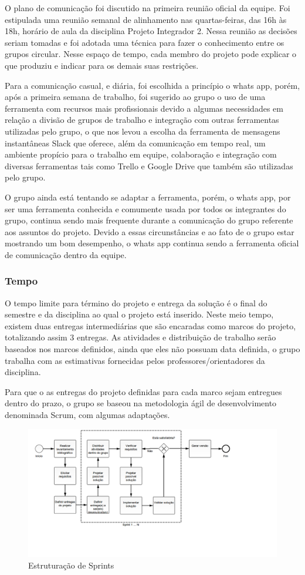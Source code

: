 O plano de comunicação foi discutido na primeira reunião oficial da equipe. Foi estipulada uma reunião semanal de alinhamento nas quartas-feiras, das 16h às 18h, horário de aula da disciplina Projeto Integrador 2. Nessa reunião as decisões seriam tomadas e foi adotada uma técnica para fazer o conhecimento entre os grupos circular. Nesse espaço de tempo, cada membro do projeto pode explicar o que produziu e indicar para os demais suas restrições.

Para a comunicação casual, e diária, foi escolhida a princípio o whats app, porém, após a primeira semana de trabalho, foi sugerido ao grupo o uso de uma ferramenta com recursos mais profissionais devido a algumas necessidades em relação a divisão de grupos de trabalho e integração com outras ferramentas utilizadas pelo grupo, o que nos levou a escolha da ferramenta de mensagens instantâneas Slack que oferece, além da comunicação em tempo real, um ambiente propício para o trabalho em equipe, colaboração e integração com diversas ferramentas tais como Trello e Google Drive que também são utilizadas pelo grupo.

O grupo ainda está tentando se adaptar a ferramenta, porém, o whats app, por ser uma ferramenta conhecida e comumente usada por todos os integrantes do grupo, continua sendo mais frequente durante a comunicação do grupo referente aos assuntos do projeto. Devido a essas circunstâncias e ao fato de o grupo estar mostrando um bom desempenho, o whats app continua sendo a ferramenta oficial de comunicação dentro da equipe.

\subsubsection{Tempo}

O tempo limite para término do projeto e entrega da solução é o final do semestre e da disciplina ao qual o projeto está inserido. Neste meio tempo, existem duas entregas intermediárias que são encaradas como marcos do projeto, totalizando assim 3 entregas. As atividades e distribuição de trabalho serão baseados nos marcos definidos, ainda que eles não possuam data definida, o grupo trabalha com as estimativas fornecidas pelos professores/orientadores da disciplina.

Para que o as entregas do projeto definidas para cada marco sejam entregues dentro do prazo, o grupo se baseou na metodologia ágil de desenvolvimento denominada Scrum, com algumas adaptações.

\begin{figure}[h]
    \centering
    \includegraphics[scale=0.5]{images/pi2-diagram.png}
    \caption{Estruturação de Sprints}
\end{figure}